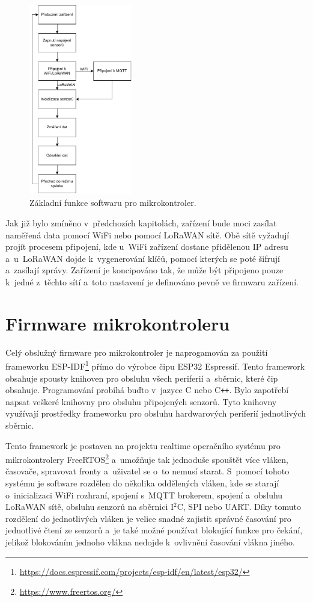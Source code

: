 \begin{figure}[h]
    \centering
    \includegraphics[width=0.4\textwidth]{obrazky/flowchart.pdf}
    \caption{Základní funkce softwaru pro mikrokontroler.}
    \label{fig_flowchart}
\end{figure}

Jak již bylo zmíněno v~předchozích kapitolách, zařízení bude moci zasílat naměřená data pomocí WiFi nebo pomocí LoRaWAN sítě. Obě sítě vyžadují projít procesem připojení, kde u~WiFi zařízení dostane přidělenou IP adresu a~u~LoRaWAN dojde k~vygenerování klíčů, pomocí kterých se poté šifrují a~zasílají zprávy. Zařízení je koncipováno tak, že může být připojeno pouze k~jedné z~těchto sítí a~toto nastavení je definováno pevně ve firmwaru zařízení. 

\section{Firmware mikrokontroleru}

Celý obslužný firmware pro mikrokontroler je naprogamován za použití frameworku ESP-IDF\footnote{\url{https://docs.espressif.com/projects/esp-idf/en/latest/esp32/}} přímo do výrobce čipu ESP32 Espressif. Tento framework obsahuje spou\-sty knihoven pro obsluhu všech periferií a~sběrnic, které čip obsahuje. Programování probíhá buďto v~jazyce C nebo C\texttt{++}. Bylo zapotřebí napsat veškeré knihovny pro obsluhu připojených senzorů. Tyto knihovny využívají prostředky frameworku pro obsluhu hardwarových periferií jednotlivých sběrnic.

Tento framework je postaven na projektu realtime operačního systému pro mikrokontrolery FreeRTOS\footnote{\url{https://www.freertos.org/}} a~umožňuje tak jednoduše spouštět více vláken, časovače, spravovat fronty a~uživatel se o~to nemusí starat. S~pomocí tohoto systému je software rozdělen do několika oddělených vláken, kde se starají o~inicializaci WiFi rozhraní, spojení s~MQTT brokerem, spojení a~obsluhu LoRaWAN sítě, obsluhu senzorů na sběrnici I$^2$C, SPI nebo UART. Díky tomuto rozdělení do jednotlivých vláken je velice snadné zajistit správné časování pro jednotlivé čtení ze senzorů a~je také možné používat blokující funkce pro čekání, jelikož blokováním jednoho vlákna nedojde k~ovlivnění časování vlákna jiného.


